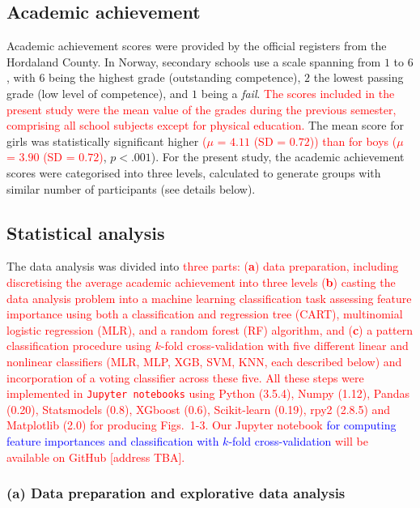 \documentclass[10pt,letterpaper]{article}
\begin{document}
\subsection*{Academic achievement}
Academic achievement scores were provided by the official registers from the Hordaland County. In Norway, secondary schools use a scale spanning from $1$ to $6$, with $6$ 
being the highest grade (outstanding competence),  $2$  the lowest passing grade (low level of competence), and $1$ being a {\it fail}. 
\textcolor{red}{The scores included in the present study were the mean value of the grades during the previous semester, comprising all school subjects except for physical education. }
The mean score for girls was statistically significant higher  \textcolor{red}{($\mu$ = $4.11$ (SD = $0.72$)) than for boys {($\mu$ = $3.90$ (SD = $0.72$)}}, $p  <  .001$). 
For the present study, the academic achievement scores were categorised into three levels, calculated to generate groups with similar number of participants (see details below). 



\subsection*{Statistical analysis}
The data analysis was divided into \textcolor{red}{three parts: ({\bf  a}) data preparation, including discretising the average academic achievement into three levels  ({\bf b}) casting the data analysis problem 
into a machine learning classification task assessing feature importance using both 
a classification and regression tree (CART), multinomial logistic regression (MLR), and a random forest (RF) algorithm, and ({\bf c}) a pattern 
classification procedure using $k$-fold cross-validation with five different linear and nonlinear classifiers (MLR, MLP, XGB, SVM, KNN, each described below) and incorporation of
a voting classifier across  these five.
All these steps were implemented in {\tt Jupyter notebooks}  using Python (3.5.4), Numpy (1.12), Pandas (0.20), Statsmodels (0.8),  XGboost (0.6), Scikit-learn (0.19),  rpy2 (2.8.5)
and Matplotlib (2.0) for producing Figs.~1-3. Our Jupyter notebook \textcolor{blue}{for computing feature importances and 
classification with $k$-fold cross-validation} will be available on GitHub [address TBA].}  

\vspace{3mm}
\subsubsection*{(a) Data preparation and explorative data analysis}
\end{document}
